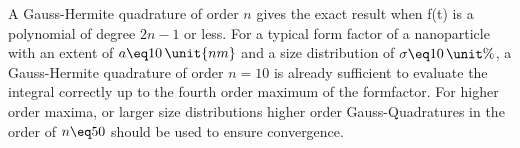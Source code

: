 \documentclass[\main/dresen_thesis.tex]{subfiles}
\begin{document}
A Gauss-Hermite quadrature of order $n$ gives the exact result when f(t) is a polynomial of degree $2n-1$ or less.
For a typical form factor of a nanoparticle with an extent of $a \eq10 \, \unit{nm}$ and a size distribution of $\sigma \eq 10\,\unit{\%}$, a Gauss-Hermite quadrature of order $n=10$ is already sufficient to evaluate the integral correctly up to the fourth order maximum of the formfactor.
For higher order maxima, or larger size distributions higher order Gauss-Quadratures in the order of $n\eq50$ should be used to ensure convergence.
\end{document}
